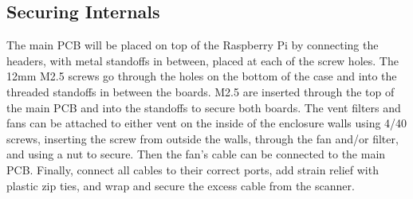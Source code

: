 \subsection{Securing Internals}
The main PCB will be placed on top of the Raspberry Pi by connecting the headers, with metal standoffs in between, placed at each of the screw holes. The 12mm M2.5 screws go through the holes on the bottom of the case and into the threaded standoffs in between the boards. M2.5 are inserted through the top of the main PCB and into the standoffs to secure both boards. The vent filters and fans can be attached to either vent on the inside of the enclosure walls using 4/40 screws, inserting the screw from outside the walls, through the fan and/or filter, and using a nut to secure. Then the fan's cable can be connected to the main PCB. Finally, connect all cables to their correct ports, add strain relief with plastic zip ties, and wrap and secure the excess cable from the scanner.
